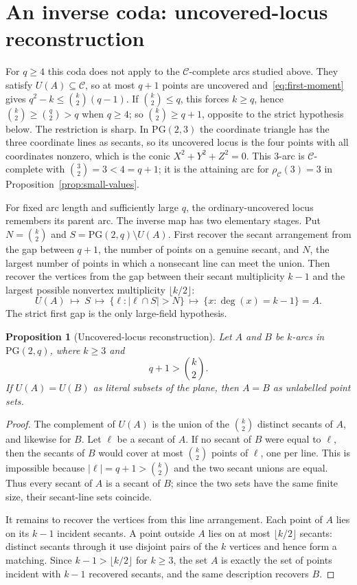 \documentclass[11pt]{article}
\newtheorem{proposition}[theorem]{Proposition}
\theoremstyle{definition}
\theoremstyle{remark}
\newcommand{\PG}{\mathrm{PG}}
\newcommand{\cC}{\mathcal{C}}
\newcommand{\rhoC}{\rho_{\cC}}
\begin{document}
\section{An inverse coda: uncovered-locus reconstruction}
\label{sec:reconstruction}

For \(q\ge4\) this coda does not apply to the \(\cC\)-complete arcs
studied above.  They satisfy \(U(A)\subseteq\cC\), so at most \(q+1\)
points are uncovered and~\eqref{eq:first-moment} gives
\(q^2-k\le\binom{k}{2}(q-1)\).  If \(\binom{k}{2}\le q\), this forces
\(k\ge q\), hence \(\binom{k}{2}\ge\binom{q}{2}>q\) when \(q\ge4\); so
\(\binom{k}{2}\ge q+1\), opposite to the strict hypothesis below.  The
restriction is sharp.  In \(\PG(2,3)\) the coordinate triangle has the
three coordinate lines as secants, so its uncovered locus is the four
points with all coordinates nonzero, which is the conic
\(X^2+Y^2+Z^2=0\).  This \(3\)-arc is \(\cC\)-complete with
\(\binom{3}{2}=3<4=q+1\); it is the attaining arc for \(\rhoC(3)=3\) in
Proposition~\ref{prop:small-values}.

For fixed arc length and sufficiently large \(q\), the ordinary-uncovered
locus remembers its parent arc.  The inverse map has two elementary stages.
Put $N=\binom{k}{2}$ and
$S=\PG(2,q)\setminus U(A)$.  First recover the secant arrangement from the
gap between $q+1$, the number of points on a genuine secant, and $N$, the
largest number of points in which a nonsecant line can meet the union.
Then recover the vertices from the gap between their secant multiplicity
$k-1$ and the largest possible nonvertex multiplicity $\lfloor k/2\rfloor$:
\[
 U(A)
 \ \longmapsto\
 S
 \ \longmapsto\
 \{\ell:|\ell\cap S|>N\}
 \ \longmapsto\
 \{x:\deg(x)=k-1\}=A.
\]
The strict first gap is the only large-field hypothesis.

\begin{proposition}[Uncovered-locus reconstruction]
\label{prop:arc-reconstruction}
Let $A$ and $B$ be $k$-arcs in $\PG(2,q)$, where $k\ge3$ and
\[
 q+1>\binom{k}{2}.
\]
If $U(A)=U(B)$ as literal subsets of the plane, then $A=B$ as unlabelled
point sets.
\end{proposition}

\begin{proof}
The complement of $U(A)$ is the union of the $\binom{k}{2}$ distinct
secants of $A$, and likewise for $B$.  Let $\ell$ be a secant of $A$.  If
no secant of $B$ were equal to $\ell$, then the secants of $B$ would cover
at most $\binom{k}{2}$ points of $\ell$, one per line.  This is impossible
because $|\ell|=q+1>\binom{k}{2}$ and the two secant unions are equal.
Thus every secant of $A$ is a secant of $B$; since the two sets have the
same finite size, their secant-line sets coincide.

It remains to recover the vertices from this line arrangement.  Each point
of $A$ lies on its $k-1$ incident secants.  A point outside $A$ lies on at
most $\lfloor k/2\rfloor$ secants: distinct secants through it use disjoint
pairs of the $k$ vertices and hence form a matching.  Since
$k-1>\lfloor k/2\rfloor$ for $k\ge3$, the set $A$ is exactly the set of
points incident with $k-1$ recovered secants, and the same description
recovers $B$.
\end{proof}
\end{document}
